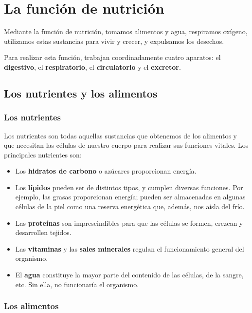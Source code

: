 \section{La función de nutrición}

Mediante la función de nutrición, tomamos alimentos y agua, respiramos oxígeno, utilizamos estas sustancias para vivir y crecer, y expulsamos los desechos.

\vspace{3mm}
Para realizar esta función, trabajan coordinadamente cuatro aparatos: el \textbf{digestivo}, el \textbf{respiratorio}, el \textbf{circulatorio} y el \textbf{excretor}.

\subsection{Los nutrientes y los alimentos}

\subsubsection{Los nutrientes}

Los nutrientes son todas aquellas sustancias que obtenemos de los alimentos y que necesitan las células de nuestro cuerpo para realizar sus funciones vitales. Los principales nutrientes son:

\begin{itemize}
    \item Los \textbf{hidratos de carbono} o azúcares proporcionan energía.
    \item Los \textbf{lípidos} pueden ser de distintos tipos, y cumplen diversas funciones. Por ejemplo, las grasas proporcionan energía; pueden ser almacenadas en algunas células de la piel como una reserva energética que, además, nos aísla del frío.
    \item Las \textbf{proteínas} son imprescindibles para que las células se formen, crezcan y desarrollen tejidos.
    \item Las \textbf{vitaminas} y las \textbf{sales minerales} regulan el funcionamiento general del organismo.
    \item El \textbf{agua} constituye la mayor parte del contenido de las células, de la sangre, etc. Sin ella, no funcionaría el organismo.
\end{itemize}

\subsubsection{Los alimentos}

